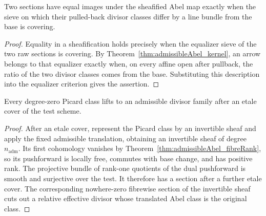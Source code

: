 \begin{theorem}
  \label{thm:admissibleAbel_etaleKernel}
  \leanok
  Two sections have equal images under the sheafified Abel map exactly when the sieve on which
  their pulled-back divisor classes differ by a line bundle from the base is covering.
\end{theorem}
\begin{proof}
  Equality in a sheafification holds precisely when the equalizer sieve of the two raw
  sections is covering.  By Theorem~\ref{thm:admissibleAbel_kernel}, an arrow belongs to that
  equalizer exactly when, on every affine open after pullback, the ratio of the two divisor
  classes comes from the base.  Substituting this description into the equalizer criterion
  gives the assertion.
\end{proof}

\begin{theorem}
  \label{thm:admissibleAbel_etaleLocallySurjective}
  \leanok
  Every degree-zero Picard class lifts to an admissible divisor family after an etale cover of
  the test scheme.
\end{theorem}
\begin{proof}
  After an etale cover, represent the Picard class by an invertible sheaf and apply the fixed
  admissible translation, obtaining an invertible sheaf of degree \(n_{\mathrm{adm}}\).
  Its first cohomology vanishes by Theorem~\ref{thm:admissibleAbel_fibreRank}, so its
  pushforward is locally free, commutes with base change, and has positive rank.  The
  projective bundle of rank-one quotients of the dual pushforward is smooth and surjective
  over the test.  It therefore has a section after a further etale cover.  The corresponding
  nowhere-zero fibrewise section of the invertible sheaf cuts out a relative effective
  divisor whose translated Abel class is the original class.
\end{proof}

